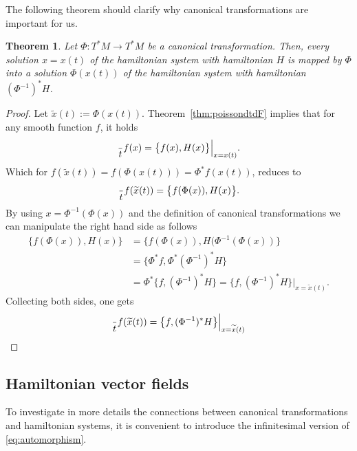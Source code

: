 \documentclass[english,fontsize=11pt,paper=a5,oneside]{scrbook}
\let\d\relax
\newcommand{\d}{\mathrm{d}}
\newtheorem{theorem}{Theorem}[chapter]
\theoremstyle{definition}
\begin{document}
The following theorem should clarify why canonical transformations are important for us.
\begin{theorem}\label{thm:canonicalmapping}
  Let $\Phi: T^*M \to T^* M$ be a canonical transformation.
  Then, every solution $x = x(t)$ of the hamiltonian system with hamiltonian $H$ is mapped by $\Phi$ into a solution $\Phi(x(t))$ of the hamiltonian system with hamiltonian $(\Phi^{-1})^* H$.
\end{theorem}
\begin{proof}
  Let $\widetilde x(t) := \Phi(x(t))$. Theorem~\ref{thm:poissondtdF} implies that for any smooth function $f$, it holds
  \begin{equation}
    \frac{\d}{\d t} f(x) = \big\{f(x), H(x)\big\}\Big|_{x=x(t)}.
  \end{equation}
  Which for $f(\widetilde x(t)) = f(\Phi(x(t))) = \Phi^* f(x(t))$, reduces to
  \begin{equation}
    \frac{\d}{\d t} f(\widetilde x(t)) = \big\{f(\Phi(x)), H(x)\big\}.
  \end{equation}
  By using $x = \Phi^{-1}(\Phi(x))$ and the definition of canonical transformations we can manipulate the right hand side as follows
  \begin{align}
    \big\{f(\Phi(x)), H(x)\big\} & = \big\{f(\Phi(x)), H(\Phi^{-1}(\Phi(x))\big\}                                                     \\
                                 & = \big\{\Phi^* f, \Phi^* (\Phi^{-1})^* H\big\}                                                     \\
                                 & = \Phi^* \big\{f, (\Phi^{-1})^* H\big\} = \big\{f, (\Phi^{-1})^* H\big\}\Big|_{x=\widetilde x(t)}.
  \end{align}
  Collecting both sides, one gets
  \begin{equation}
    \frac{\d}{\d t} f(\widetilde x(t)) = \big\{f, (\Phi^{-1})^* H\big\}\Big|_{x=\widetilde x(t)}
  \end{equation}
\end{proof}

\subsection{Hamiltonian vector fields}

To investigate in more details the connections between canonical transformations and hamiltonian systems, it is convenient to introduce the infinitesimal version of \eqref{eq:automorphism}.
\end{document}
